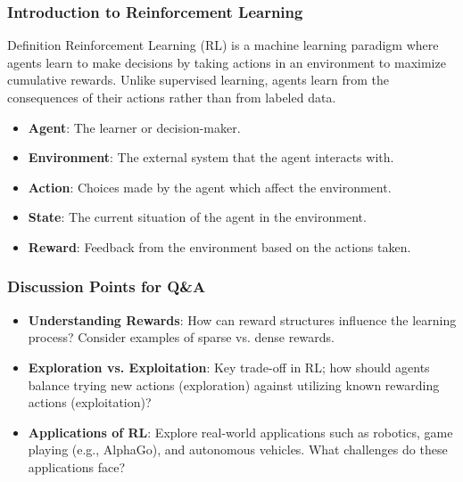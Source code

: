 \documentclass[aspectratio=169]{beamer}
\begin{document}
\begin{frame}[fragile]
    \frametitle{Introduction to Reinforcement Learning}
    \begin{block}{Definition}
        Reinforcement Learning (RL) is a machine learning paradigm where agents learn to make decisions by taking actions in an environment to maximize cumulative rewards. Unlike supervised learning, agents learn from the consequences of their actions rather than from labeled data.
    \end{block}
    
    \begin{itemize}
        \item \textbf{Agent}: The learner or decision-maker.
        \item \textbf{Environment}: The external system that the agent interacts with.
        \item \textbf{Action}: Choices made by the agent which affect the environment.
        \item \textbf{State}: The current situation of the agent in the environment.
        \item \textbf{Reward}: Feedback from the environment based on the actions taken.
    \end{itemize}
\end{frame}

\begin{frame}[fragile]
    \frametitle{Discussion Points for Q\&A}
    \begin{itemize}
        \item \textbf{Understanding Rewards}: How can reward structures influence the learning process? Consider examples of sparse vs. dense rewards.
        \item \textbf{Exploration vs. Exploitation}: Key trade-off in RL; how should agents balance trying new actions (exploration) against utilizing known rewarding actions (exploitation)?
        \item \textbf{Applications of RL}: Explore real-world applications such as robotics, game playing (e.g., AlphaGo), and autonomous vehicles. What challenges do these applications face?
    \end{itemize}
\end{frame}
\end{document}
